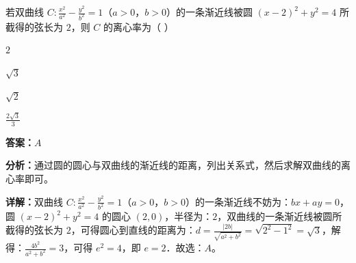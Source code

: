 \begin{question}[points=5]
若双曲线 $C:\frac{x^2}{a^2}-\frac{y^2}{b^2}=1$（$a>0$，$b>0$）的一条渐近线被圆 $(x-2)^2+y^2=4$ 所截得的弦长为 $2$，则 $C$ 的离心率为（   ）
\begin{choices}
  \item $2$
  \item $\sqrt{3}$
  \item $\sqrt{2}$
  \item $\frac{2\sqrt{3}}{3}$
\end{choices}
\begin{solution}
\textbf{答案：}$A$

\textbf{分析：}通过圆的圆心与双曲线的渐近线的距离，列出关系式，然后求解双曲线的离心率即可。

\textbf{详解：}双曲线 $C:\frac{x^2}{a^2}-\frac{y^2}{b^2}=1$（$a>0$，$b>0$）的一条渐近线不妨为：$bx+ay=0$，圆 $(x-2)^2+y^2=4$ 的圆心 $(2,0)$，半径为：$2$，双曲线的一条渐近线被圆所截得的弦长为 $2$，可得圆心到直线的距离为：$d=\frac{|2b|}{\sqrt{a^2+b^2}}=\sqrt{2^2-1^2}=\sqrt{3}$，解得：$\frac{4b^2}{a^2+b^2}=3$，可得 $e^2=4$，即 $e=2$．故选：$A$。
\end{solution}
\end{question}

